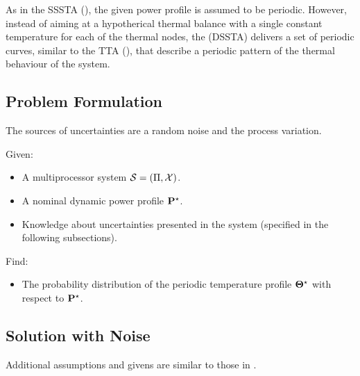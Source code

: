 As in the SSSTA (), the given power profile is assumed to be periodic. However, instead of aiming at a hypotherical thermal balance with a single constant temperature for each of the thermal nodes, the  (DSSTA) delivers a set of periodic curves, similar to the TTA (), that describe a periodic pattern of the thermal behaviour of the system.

\subsection{Problem Formulation}
The sources of uncertainties are a random noise and the process variation.

Given:
\begin{itemize}
  \item A multiprocessor system $\mathcal{S} = (\Pi, \mathcal{X})$.
  \item A nominal dynamic power profile $\mathbf{P}^\star$.
  \item Knowledge about uncertainties presented in the system (specified in the following subsections).
\end{itemize}

Find:
\begin{itemize}
  \item The probability distribution of the periodic temperature profile $\mathbf{\Theta}^\star$ with respect to $\mathbf{P}^\star$.
\end{itemize}

\subsection{Solution with Noise}
Additional assumptions and givens are similar to those in .

